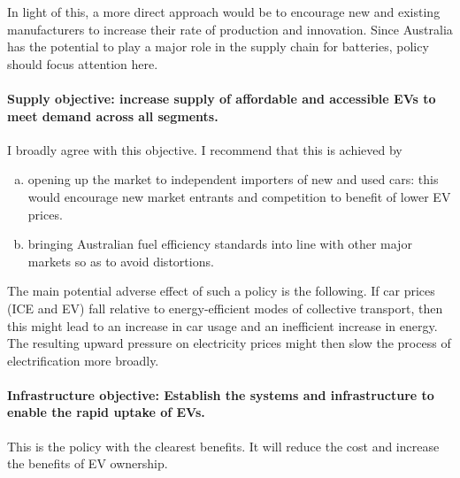 \documentclass[12pt, draft]{article} \usepackage[shortlabels]{enumitem}
\begin{document}
In light of this, a more direct approach would be to encourage new and existing
manufacturers to increase their rate of production and innovation. Since
Australia has the potential to play a major role in the supply chain for
batteries, policy should focus attention here.

\paragraph{Supply objective: increase supply of affordable and accessible EVs
to meet demand across all segments.} I broadly agree with this objective. I
recommend that this is achieved by

\begin{enumerate}[(a)]

\item
opening up the market to independent importers of new and used cars: this would
encourage new market entrants and competition to benefit of lower EV prices.

\item
bringing Australian fuel efficiency standards into line with other major
markets so as to avoid distortions.

\end{enumerate}

The main potential adverse effect of such a policy is the following. If car
prices (ICE and EV) fall relative to energy-efficient modes of collective
transport, then this might lead to an increase in car usage and an inefficient
increase in energy. The resulting upward pressure on electricity prices might
then slow the process of electrification more broadly.

\paragraph{Infrastructure objective: Establish the systems and infrastructure
to enable the rapid uptake of EVs.}

This is the policy with the clearest benefits. It will reduce the cost and
increase the benefits of EV ownership.
\end{document}
